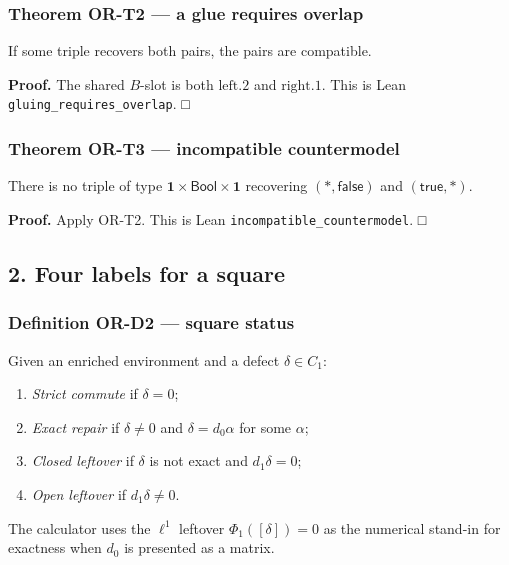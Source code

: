 \documentclass[
  11pt,
]{article}
\providecommand{\tightlist}{%
  \setlength{\itemsep}{0pt}\setlength{\parskip}{0pt}}
\begin{document}
\subsubsection{Theorem OR-T2 --- a glue requires overlap}\label{theorem-or-t2-a-glue-requires-overlap}

If some triple recovers both pairs, the pairs are compatible.

\textbf{Proof.} The shared \(B\)-slot is both \(\mathrm{left}.2\) and \(\mathrm{right}.1\). This is Lean \nolinkurl{gluing_requires_overlap}. □

\subsubsection{Theorem OR-T3 --- incompatible countermodel}\label{theorem-or-t3-incompatible-countermodel}

There is no triple of type \(\mathbf{1}\times\mathsf{Bool}\times\mathbf{1}\) recovering \((*,\mathsf{false})\) and \((\mathsf{true},*)\).

\textbf{Proof.} Apply OR-T2. This is Lean \nolinkurl{incompatible_countermodel}. □

\subsection{2. Four labels for a square}\label{four-labels-for-a-square}

\subsubsection{Definition OR-D2 --- square status}\label{definition-or-d2-square-status}

Given an enriched environment and a defect \(\delta\in C_1\):

\begin{enumerate}
\def\labelenumi{\arabic{enumi}.}
\tightlist
\item
  \emph{Strict commute} if \(\delta=0\);
\item
  \emph{Exact repair} if \(\delta\neq 0\) and \(\delta=d_0\alpha\) for some \(\alpha\);
\item
  \emph{Closed leftover} if \(\delta\) is not exact and \(d_1\delta=0\);
\item
  \emph{Open leftover} if \(d_1\delta\neq 0\).
\end{enumerate}

The calculator uses the \(\ell^1\) leftover \(\Phi_1([\delta])=0\) as the numerical stand-in for exactness when \(d_0\) is presented as a matrix.
\end{document}
